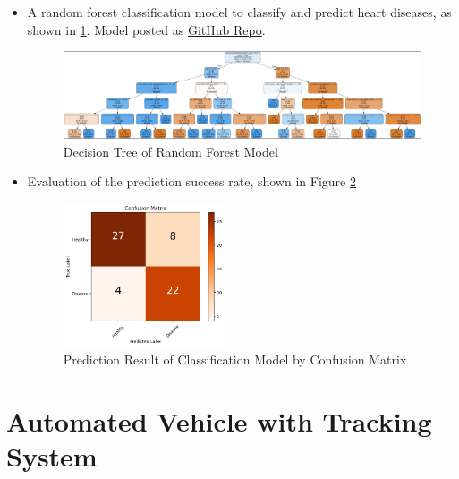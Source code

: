 \documentclass[12pt]{article}
\begin{document}
\begin{itemize}

    \item{A random forest classification model to classify and predict heart diseases, as shown in \ref*{Random Forest Model}. Model posted as \href{https://github.com/Robin0265/HeartDisease_Regression}{GitHub Repo}.}
    
    \begin{figure}[H]
        \centering
        \includegraphics[width=1.0\textwidth]{portfolio/Decision_Tree.png}
        \caption{Decision Tree of Random Forest Model}
        \label{Random Forest Model}
    \end{figure}

    \item {Evaluation of the prediction success rate, shown in Figure \ref*{Model-Evaluation}}
    \begin{figure}[H]
        \centering
        \includegraphics[width=0.45\textwidth]{portfolio/Confusion_Matrix.png}
        \caption{Prediction Result of Classification Model by Confusion Matrix}
        \label{Model-Evaluation}
    \end{figure}
    
\end{itemize}

\newpage

\section{Automated Vehicle with Tracking System}
\end{document}
